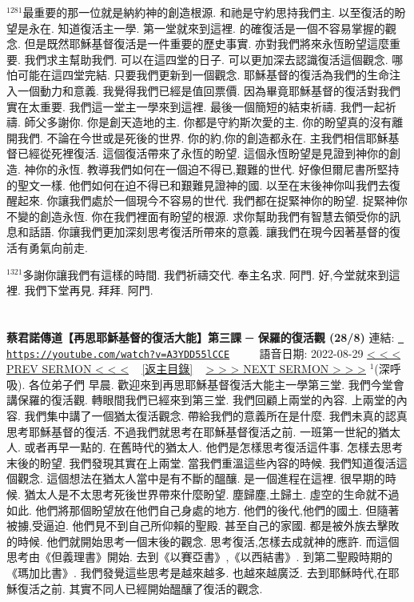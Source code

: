 \documentclass{book}
\begin{document}
$^{1281}$最重要的那一位就是納約神的創造根源.
和祂是守約思持我們主.
以至復活的盼望是永在.
知道復活主一學.
第一堂就來到這裡.
的確復活是一個不容易掌握的觀念.
但是既然耶穌基督復活是一件重要的歷史事實.
亦對我們將來永恆盼望這麼重要.
我們求主幫助我們.
可以在這四堂的日子.
可以更加深去認識復活這個觀念.
哪怕可能在這四堂完結.
只要我們更新到一個觀念.
耶穌基督的復活為我們的生命注入一個動力和意義.
我覺得我們已經是值回票價.
因為畢竟耶穌基督的復活對我們實在太重要.
我們這一堂主一學來到這裡.
最後一個簡短的結束祈禱.
我們一起祈禱.
師父多謝你.
你是創天造地的主.
你都是守約斯次愛的主.
你的盼望真的沒有離開我們.
不論在今世或是死後的世界.
你的約,你的創造都永在.
主我們相信耶穌基督已經從死裡復活.
這個復活帶來了永恆的盼望.
這個永恆盼望是見證到神你的創造.
神你的永恆.
教導我們如何在一個迫不得已,艱難的世代.
好像但爾尼書所堅持的聖文一樣.
他們如何在迫不得已和艱難見證神的國.
以至在末後神你叫我們去復醒起來.
你讓我們處於一個現今不容易的世代.
我們都在捉緊神你的盼望.
捉緊神你不變的創造永恆.
你在我們裡面有盼望的根源.
求你幫助我們有智慧去領受你的訊息和話語.
你讓我們更加深刻思考復活所帶來的意義.
讓我們在現今因著基督的復活有勇氣向前走.

$^{1321}$多謝你讓我們有這樣的時間.
我們祈禱交代.
奉主名求.
阿門.
好,今堂就來到這裡.
我們下堂再見.
拜拜.
阿門.
\newpage



\section{}
\label{sec:A3YDD55lCCE}
\textbf{蔡君諾傳道【再思耶穌基督的復活大能】第三課 ─ 保羅的復活觀 (28/8)}
\newline
\newline
連結: \href{https://youtube.com/watch?v=A3YDD55lCCE}{\texttt{ https://youtube.com/watch?v=A3YDD55lCCE}} ~~~~ 語音日期: 2022-08-29 
\newline
\newline
\hyperref[sec:MrgiW6jGDH4]{\small{< < < PREV SERMON < < <}}
~
\hyperref[sec:index]{\small{[返主目錄]}}
~
\hyperref[sec:VcMUdsC37SI]{\small{> > > NEXT SERMON > > >}}
\newline
\newline
$^{1}$(深呼吸).
各位弟子們 早晨.
歡迎來到再思耶穌基督復活大能主一學第三堂.
我們今堂會講保羅的復活觀.
轉眼間我們已經來到第三堂.
我們回顧上兩堂的內容.
上兩堂的內容.
我們集中講了一個猶太復活觀念.
帶給我們的意義所在是什麼.
我們未真的認真思考耶穌基督的復活.
不過我們就思考在耶穌基督復活之前.
一班第一世紀的猶太人.
或者再早一點的.
在舊時代的猶太人.
他們是怎樣思考復活這件事.
怎樣去思考末後的盼望.
我們發現其實在上兩堂.
當我們重溫這些內容的時候.
我們知道復活這個觀念.
這個想法在猶太人當中是有不斷的醞釀.
是一個進程在這裡.
很早期的時候.
猶太人是不太思考死後世界帶來什麼盼望.
塵歸塵,土歸土.
虛空的生命就不過如此.
他們將那個盼望放在他們自己身處的地方.
他們的後代,他們的國土.
但隨著被擄,受逼迫.
他們見不到自己所仰賴的聖殿.
甚至自己的家國.
都是被外族去擊敗的時候.
他們就開始思考一個末後的觀念.
思考復活,怎樣去成就神的應許.
而這個思考由《但義理書》開始.
去到《以賽亞書》,《以西結書》.
到第二聖殿時期的《瑪加比書》.
我們發覺這些思考是越來越多.
也越來越廣泛.
去到耶穌時代,在耶穌復活之前.
其實不同人已經開始醞釀了復活的觀念.
\end{document}

